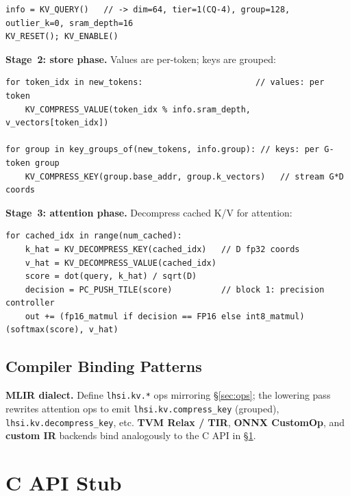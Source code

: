 \documentclass[11pt]{article}
\begin{document}
\begin{lstlisting}[basicstyle=\ttfamily\small]
info = KV_QUERY()   // -> dim=64, tier=1(CQ-4), group=128, outlier_k=0, sram_depth=16
KV_RESET(); KV_ENABLE()
\end{lstlisting}

\textbf{Stage~2: store phase.} Values are per-token; keys are grouped:

\begin{lstlisting}[basicstyle=\ttfamily\small]
for token_idx in new_tokens:                       // values: per token
    KV_COMPRESS_VALUE(token_idx % info.sram_depth, v_vectors[token_idx])

for group in key_groups_of(new_tokens, info.group): // keys: per G-token group
    KV_COMPRESS_KEY(group.base_addr, group.k_vectors)   // stream G*D coords
\end{lstlisting}

\textbf{Stage~3: attention phase.} Decompress cached K/V for attention:

\begin{lstlisting}[basicstyle=\ttfamily\small]
for cached_idx in range(num_cached):
    k_hat = KV_DECOMPRESS_KEY(cached_idx)   // D fp32 coords
    v_hat = KV_DECOMPRESS_VALUE(cached_idx)
    score = dot(query, k_hat) / sqrt(D)
    decision = PC_PUSH_TILE(score)          // block 1: precision controller
    out += (fp16_matmul if decision == FP16 else int8_matmul)(softmax(score), v_hat)
\end{lstlisting}

\subsection{Compiler Binding Patterns}
\label{sec:bindings}

\noindent\textbf{MLIR dialect.} Define \texttt{lhsi.kv.*} ops mirroring
\S\ref{sec:ops}; the lowering pass rewrites attention ops to emit
\texttt{lhsi.kv.compress\_key} (grouped), \texttt{lhsi.kv.decompress\_key}, etc.
\noindent\textbf{TVM Relax / TIR}, \textbf{ONNX CustomOp}, and \textbf{custom IR}
backends bind analogously to the C API in \S\ref{sec:capi}.

\section{C API Stub}
\label{sec:capi}
\end{document}
